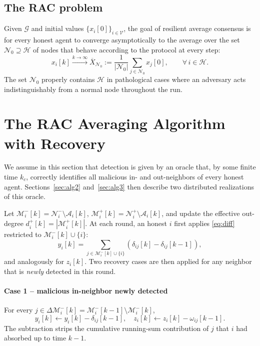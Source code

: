 \documentclass[journal]{IEEEtran}
\newcommand{\NN}{\mathcal{N}}
\newcommand{\HH}{\mathcal{H}}
\newcommand{\AA}{\mathcal{A}}
\newcommand{\MM}{\mathcal{M}}
\newcommand{\GG}{\mathcal{G}}
\newcommand{\VV}{\mathcal{V}}
\begin{document}
\subsection{The RAC problem}
Given $\GG$ and initial values $\{x_i[0]\}_{i\in\VV}$, the goal of resilient
average consensus is for every honest agent to converge asymptotically to the
average over the set $\NN_0\supseteq\HH$ of nodes that behave according to
the protocol at every step:
\begin{equation}
\label{eq:racgoal}
x_i[k] \xrightarrow{k\to\infty} \overline{X}_{\NN_0}
:= \frac{1}{|\NN_0|}\sum_{j\in\NN_0} x_j[0], \qquad \forall\, i\in\HH.
\end{equation}
The set $\NN_0$ properly contains $\HH$ in pathological cases where an
adversary acts indistinguishably from a normal node throughout the run.

\section{The RAC Averaging Algorithm with Recovery}
\label{sec:rac}

We assume in this section that detection is given by an oracle that, by some
finite time $k_c$, correctly identifies all malicious in- and out-neighbors of
every honest agent.  Sections~\ref{sec:alg2} and~\ref{sec:alg3} then describe
two distributed realizations of this oracle.

Let $\MM_i^-[k] = \NN_i^-\setminus \AA_i[k]$,
$\MM_i^+[k] = \NN_i^+\setminus \AA_i[k]$, and update the effective out-degree
$d_i^+[k]=|\MM_i^+[k]|$.  At each round, an honest $i$ first applies
\eqref{eq:diff} restricted to $\MM_i^-[k]\cup\{i\}$:
\begin{equation}
\label{eq:y}
y_i[k] = \!\!\sum_{j\in\MM_i^-[k]\cup\{i\}}\!\! (\delta_{ij}[k]-\delta_{ij}[k-1]),
\end{equation}
and analogously for $z_i[k]$.  Two recovery cases are then applied for any
neighbor that is \emph{newly} detected in this round.

\paragraph*{Case 1 -- malicious in-neighbor newly detected}
For every $j\in\Delta\MM_i^-[k] = \MM_i^-[k\!-\!1]\setminus\MM_i^-[k]$,
\begin{equation}
\label{eq:case1}
y_i[k] \leftarrow y_i[k] - \delta_{ij}[k\!-\!1], \quad
z_i[k] \leftarrow z_i[k] - \omega_{ij}[k\!-\!1].
\end{equation}
The subtraction strips the cumulative running-sum contribution of $j$ that
$i$ had absorbed up to time $k\!-\!1$.
\end{document}
